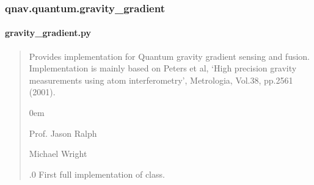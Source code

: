 \documentclass[letterpaper,10pt,english]{sphinxmanual}
\begin{document}
\sphinxstepscope


\subsubsection{qnav.quantum.gravity\_gradient}
\label{\detokenize{modules/quantum/gravity_gradient:module-qnav.quantum.gravity_gradient}}\label{\detokenize{modules/quantum/gravity_gradient:qnav-quantum-gravity-gradient}}\label{\detokenize{modules/quantum/gravity_gradient::doc}}

\paragraph{gravity\_gradient.py}
\label{\detokenize{modules/quantum/gravity_gradient:gravity-gradient-py}}\begin{quote}\begin{description}
\sphinxAtStartPar
Provides implementation for Quantum gravity gradient sensing and fusion.
Implementation is mainly based on Peters et al, ‘High precision gravity
measurements using atom interferometry’, Metrologia, Vol.38,
pp.25\sphinxhyphen{}61 (2001).

\begin{DUlineblock}{0em}
\item[] Prof. Jason Ralph \sphinxhyphen{} 
\item[] Michael Wright \sphinxhyphen{} 
\end{DUlineblock}

.0 \sphinxhyphen{} First full implementation of class.

\end{description}\end{quote}
\end{document}

